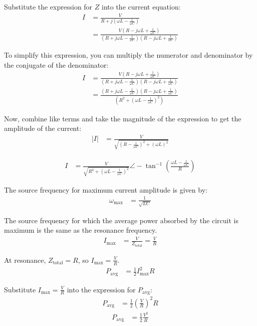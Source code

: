 \documentclass[journal,12pt,twocolumn]{IEEEtran}
\theoremstyle{remark}
\begin{document}
Substitute the expression for \(Z\) into the current equation:
\begin{align}
    I &= \frac{V}{R + j(\omega L - \frac{1}{\omega C})} \\
    &= \frac{V(R - j\omega L + \frac{1}{\omega C})}{(R + j\omega L - \frac{1}{\omega C})(R - j\omega L + \frac{1}{\omega C})}
\end{align}

To simplify this expression, you can multiply the numerator and denominator by the conjugate of the denominator:
\begin{align}
    I &= \frac{V(R - j\omega L + \frac{1}{\omega C})}{(R + j\omega L - \frac{1}{\omega C})(R - j\omega L + \frac{1}{\omega C})} \\
    &= \frac{(R + j\omega L - \frac{1}{\omega C})(R - j\omega L + \frac{1}{\omega C})}{(R^2 + (\omega L - \frac{1}{\omega C})^2)}
\end{align}

Now, combine like terms and take the magnitude of the expression to get the amplitude of the current:
\begin{align}
    |I| &= \frac{V}{\sqrt{(R - \frac{1}{\omega C})^2 + (\omega L)^2}}
\end{align}

\begin{align}
    I &= \frac{V}{\sqrt{R^2 + (\omega L - \frac{1}{\omega C})^2}} \angle -\tan^{-1}\left(\frac{\omega L - \frac{1}{\omega C}}{R}\right)
\end{align}

The source frequency for maximum current amplitude is given by:
\begin{align}
    \omega_{\text{max}} &= \frac{1}{\sqrt{LC}}\label{eq:omega_max}
\end{align}

The source frequency for which the average power absorbed by the circuit is maximum is the same as the resonance frequency. 
\begin{align}
    I_{\text{max}} &= \frac{V}{Z_{\text{total}}} = \frac{V}{R}
\end{align}

At resonance, \(Z_{\text{total}} = R\), so \(I_{\text{max}} = \frac{V}{R}\).
\begin{align}
    P_{\text{avg}} &= \frac{1}{2} I_{\text{max}}^2 R
\end{align}

Substitute \(I_{\text{max}} = \frac{V}{R}\) into the expression for \(P_{\text{avg}}\):
\begin{align}
    P_{\text{avg}} &= \frac{1}{2} \left(\frac{V}{R}\right)^2 R
\end{align}
\begin{align}
    P_{\text{avg}} &= \frac{1}{2} \frac{V^2}{R}
    \label{eq:9}
\end{align}
\end{document}
